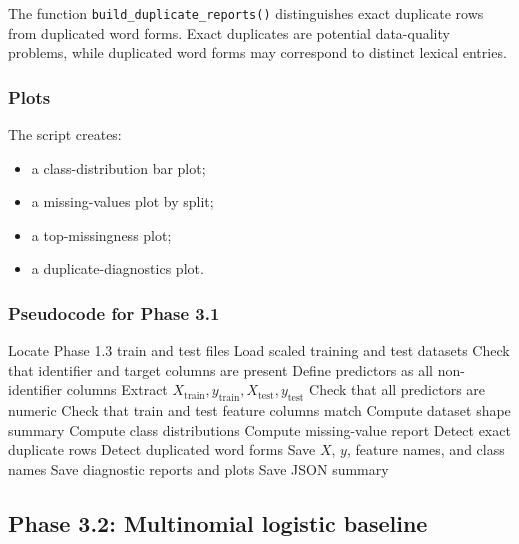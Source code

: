 \documentclass{ipgpmaster}
\begin{document}
The function \texttt{build\_duplicate\_reports()} distinguishes exact duplicate rows from duplicated word forms. Exact duplicates are potential data-quality problems, while duplicated word forms may correspond to distinct lexical entries.

\subsubsection{Plots}

The script creates:

\begin{itemize}
    \item a class-distribution bar plot;
    \item a missing-values plot by split;
    \item a top-missingness plot;
    \item a duplicate-diagnostics plot.
\end{itemize}

\subsubsection{Pseudocode for Phase 3.1}

\begin{algorithm}[H]
\caption{Phase 3.1: Supervised data loading and checks}
\begin{algorithmic}[1]
\State Locate Phase 1.3 train and test files
\State Load scaled training and test datasets
\State Check that identifier and target columns are present
\State Define predictors as all non-identifier columns
\State Extract \(X_{\text{train}}, y_{\text{train}}, X_{\text{test}}, y_{\text{test}}\)
\State Check that all predictors are numeric
\State Check that train and test feature columns match
\State Compute dataset shape summary
\State Compute class distributions
\State Compute missing-value report
\State Detect exact duplicate rows
\State Detect duplicated word forms
\State Save \(X\), \(y\), feature names, and class names
\State Save diagnostic reports and plots
\State Save JSON summary
\end{algorithmic}
\end{algorithm}

\subsection{Phase 3.2: Multinomial logistic baseline}
\end{document}
